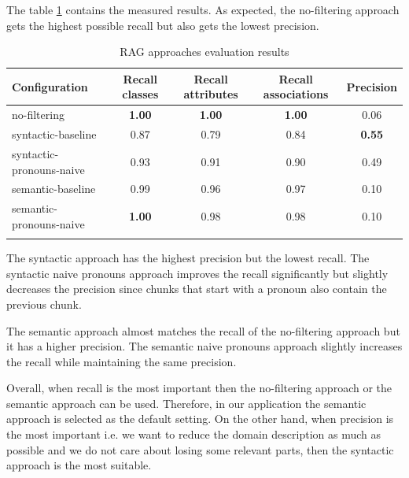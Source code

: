 The table \ref{tab:filtering-results} contains the measured results. As expected, the no-filtering approach gets the highest possible recall but also gets the lowest precision.

\begin{table}[!h]
    \scriptsize
    \centering
    \setlength{\tabcolsep}{0.5em}
    \begin{tabular}{lcccc}

    \toprule
       Configuration & Recall classes & Recall attributes & Recall associations & Precision \\
    \toprule
    
    \addlinespace
         no-filtering      & \textbf{1.00}  & \textbf{1.00}  & \textbf{1.00} & 0.06 \\
    	 syntactic-baseline & 0.87 & 0.79 & 0.84 & \textbf{0.55} \\
         syntactic-pronouns-naive & 0.93  & 0.91  & 0.90 & 0.49 \\
         semantic-baseline & 0.99 & 0.96 & 0.97 & 0.10 \\
         semantic-pronouns-naive & \textbf{1.00} & 0.98 & 0.98 & 0.10 \\
    \addlinespace
    \bottomrule
    \addlinespace
    \end{tabular}
    \caption{RAG approaches evaluation results}
    \label{tab:filtering-results}
\end{table}


The syntactic approach has the highest precision but the lowest recall. The syntactic naive pronouns approach improves the recall significantly but slightly decreases the precision since chunks that start with a pronoun also contain the previous chunk. %

The semantic approach almost matches the recall of the no-filtering approach but it has a higher precision. The semantic naive pronouns approach slightly increases the recall while maintaining the same precision.

Overall, when recall is the most important then the no-filtering approach or the semantic approach can be used. Therefore, in our application the semantic approach is selected as the default setting. On the other hand, when precision is the most important i.e. we want to reduce the domain description as much as possible and we do not care about losing some relevant parts, then the syntactic approach is the most suitable.


